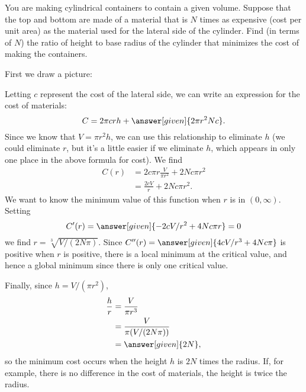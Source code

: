 \documentclass{ximera}
\begin{document}
\begin{example}
You are making cylindrical containers to contain a given volume.  Suppose
that the top and bottom are made of a material that is $N$ times as
expensive (cost per unit area) as the material used for the lateral side of
the cylinder.  Find (in terms of $N$) the ratio of height to base radius of
the cylinder that minimizes the cost of making the containers.
\begin{explanation}
  First we draw a picture:
\begin{image}
\end{image}
  Letting $c$ represent the cost of the lateral side, we can write an
  expression for the cost of materials:
  \[
  C = 2\pi crh+\answer[given]{2\pi r^2Nc}.
  \]
  Since we know that $V=\pi r^2h$, we can use this relationship to
  eliminate $h$ (we could eliminate $r$, but it's a little easier if we
  eliminate $h$, which appears in only one place in the above formula
  for cost).  We find
\begin{align*}
  C(r)&=2c\pi r\frac{V}{\pi r^2}+2Nc\pi r^2\\
  &=\frac{2cV}{r}+2Nc\pi r^2.
\end{align*}
We want to know the minimum value of this function when $r$ is in
$(0,\infty)$. Setting
\[
C'(r)=\answer[given]{-2cV/r^2+4Nc\pi r} =0
\]
we find $r=\sqrt[3]{V/(2N\pi)}$.  Since $C''(r)=\answer[given]{4cV/r^3+4Nc\pi}$ is
positive when $r$ is positive, there is a local minimum at the
critical value, and hence a global minimum since there is only one
critical value.

Finally, since $h=V/(\pi r^2)$, 
\begin{align*}
\frac{h}{r}&=\frac{V}{\pi r^3}\\ 
&=\frac{V}{\pi(V/(2N\pi))}\\ 
&=\answer[given]{2N},
\end{align*}
so the minimum cost occurs when the height $h$ is $2N$ times the
radius. If, for example, there is no difference in the cost of
materials, the height is twice the radius.
\end{explanation}
\end{example}
\end{document}
